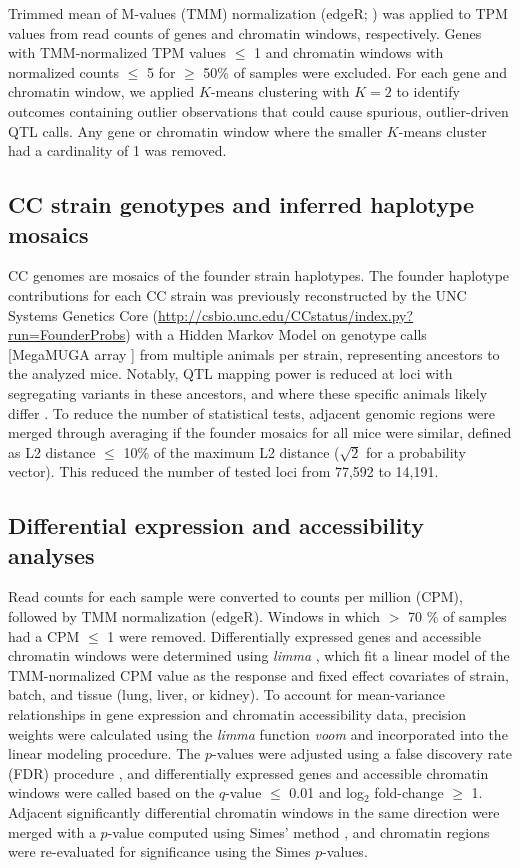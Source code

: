 \documentclass[10pt,letterpaper]{article}
\begin{document}
Trimmed mean of M-values (TMM) normalization (edgeR; \cite{edgeR}) was applied to TPM values from read counts of genes and chromatin windows, respectively. Genes with TMM-normalized TPM values $\leq$ 1 and chromatin windows with normalized counts $\leq$ 5 for $\geq$ 50\% of samples were excluded. For each gene and chromatin window, we applied $K$-means clustering with $K=2$ to identify outcomes containing outlier observations that could cause spurious, outlier-driven QTL calls. Any gene or chromatin window where the smaller $K$-means cluster had a cardinality of 1 was removed.

\subsection*{CC strain genotypes and inferred haplotype mosaics}

CC genomes are mosaics of the founder strain haplotypes. The founder haplotype contributions for each CC strain was previously reconstructed by the UNC Systems Genetics Core (\url{http://csbio.unc.edu/CCstatus/index.py?run=FounderProbs}) with a Hidden Markov Model \cite{Fu2012} on genotype calls [MegaMUGA array \cite{Morgan2016muga}] from multiple animals per strain, representing ancestors to the analyzed mice. Notably, QTL mapping power is reduced at loci with segregating variants in these ancestors, and where these specific animals likely differ \cite{Shorter2019}. To reduce the number of statistical tests, adjacent genomic regions were merged through averaging if the founder mosaics for all mice were similar, defined as L2 distance $\leq$ 10\% of the maximum L2 distance ($\sqrt{2}$ for a probability vector). This reduced the number of tested loci from 77,592 to 14,191.

\subsection*{Differential expression and accessibility analyses}

Read counts for each sample were converted to counts per million (CPM), followed by TMM normalization (edgeR). Windows in which $>$ 70 \% of samples had a CPM $\leq$ 1 were removed. Differentially expressed genes and accessible chromatin windows were determined using \textit{limma} \cite{limma}, which fit a linear model of the TMM-normalized CPM value as the response and fixed effect covariates of strain, batch, and tissue (lung, liver, or kidney). 
To account for mean-variance relationships in gene expression and chromatin accessibility data, precision weights were calculated using the \textit{limma} function \textit{voom} and incorporated into the linear modeling procedure. The $p$-values were adjusted using a false discovery rate (FDR) procedure \cite{Benjamini1995}, and differentially expressed genes and accessible chromatin windows were called based on the $q$-value $\le$ 0.01 and log$_{2}$ fold-change $\geq$ 1. Adjacent significantly differential chromatin windows in the same direction were merged with a $p$-value computed using Simes' method \cite{Sarkar1997}, and chromatin regions were re-evaluated for significance using the Simes $p$-values.
\end{document}
